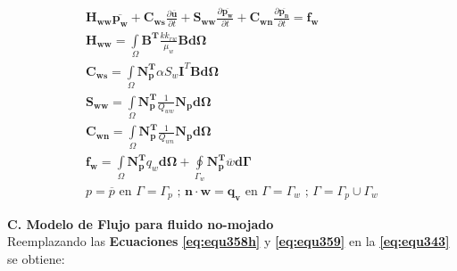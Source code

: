 \begin{ceqn} 
\begin{subequations} \label{eq:equ369} 
\begin{gather}
\mathbf{H_{ww}}\mathbf{\overline{p_w}} + \mathbf{C_{ws}}\frac{\partial \mathbf{\overline{u}}}{\partial t} + \mathbf{S_{ww}}\frac{\partial \mathbf{\overline{p_w}}}{\partial t} + \mathbf{C_{wn}}\frac{\partial \mathbf{\overline{p_n}}}{\partial t} = \mathbf{f_w}\label{eq:equ369a}\\[12pt]
\mathbf{H_{ww}} = \int\limits_\Omega \mathbf{B^T} \frac{k k_{rw}}{\mu_{w}}\mathbf{B}\mathbf{d\Omega} \label{eq:equ369b}\\[12pt]
\mathbf{C_{ws}} =  \int\limits_\Omega \mathbf{N_{p}^T}\alpha S_w\mathbf{I}^T\mathbf{B}\mathbf{d\Omega} \label{eq:equ369c}\\[12pt]
\mathbf{S_{ww}} =  \int\limits_\Omega \mathbf{N_p^T}\frac{1}{Q_{ww}}\mathbf{N_p}\mathbf{d\Omega} \label{eq:equ369d}\\[12pt]
\mathbf{C_{wn}} =  \int\limits_\Omega \mathbf{N_p^T}\frac{1}{Q_{wn}}\mathbf{N_p}\mathbf{d\Omega} \label{eq:equ369e}\\[12pt]
\mathbf{f_w} = \int\limits_\Omega \mathbf{N_{p}^T}q_w\mathbf{d\Omega} + \oint\limits_{\Gamma_{w}}  \mathbf{N_{p}^T} \overline{w} \mathbf{d\Gamma} \label{eq:equ369f}\\[12pt]
p = \overline{p} \text{  en  } \Gamma = \Gamma_p \text{ ;  } \mathbf{n}\cdot\mathbf{w}=\mathbf{q_v} \text{  en  } \Gamma = \Gamma_w \text{ ; } \Gamma = \Gamma_p \cup \Gamma_w \label{eq:equ369g}
\end{gather}  
\end{subequations} 
\end{ceqn}

\bigskip
\textbf{C. Modelo de Flujo para fluido no-mojado}\\
Reemplazando las \textbf{Ecuaciones} \textbf{\ref{eq:equ358h}} y \textbf{\ref{eq:equ359}} en la \textbf{\ref{eq:equ343}} se obtiene:\bigskip

